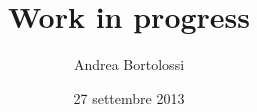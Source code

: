 \documentclass{beamer}
\author[Bortolossi]{Andrea Bortolossi}
\title[WIP]{Work in progress}
\institute[Polimi\&Micron]{Politecnico di Milano - Micron Technology}
\date{27 settembre 2013}
\theoremstyle{plain}
\begin{document}
\begin{frame}
\maketitle
\end{frame}
\begin{frame}
\tableofcontents
\end{frame}









\end{document}
